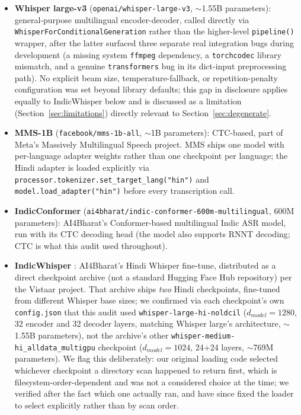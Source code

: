 \documentclass[11pt]{article}
\begin{document}
\begin{itemize}
\item \textbf{Whisper large-v3} \citep{radford2023whisper} (\texttt{openai/whisper-large-v3},
$\sim$1.55B parameters): general-purpose multilingual encoder-decoder, called directly via
\texttt{Whisper\allowbreak ForConditionalGeneration} rather than the higher-level \texttt{pipeline()} wrapper,
after the latter surfaced three separate real integration bugs during development (a missing
system \texttt{ffmpeg} dependency, a \texttt{torchcodec} library mismatch, and a genuine
\texttt{transformers} bug in its dict-input preprocessing path). No explicit beam size,
temperature-fallback, or repetition-penalty configuration was set beyond library defaults; this
gap in disclosure applies equally to IndicWhisper below and is discussed as a limitation
(Section~\ref{sec:limitations}) directly relevant to Section~\ref{sec:degenerate}.
\item \textbf{MMS-1B} \citep{pratap2023mms} (\texttt{facebook/mms-1b-all}, $\sim$1B parameters):
CTC-based, part of Meta's Massively Multilingual Speech project. MMS ships one model with
per-language adapter weights rather than one checkpoint per language; the Hindi adapter is loaded
explicitly via \texttt{processor.\allowbreak tokenizer.\allowbreak set\_target\_lang("hin")} and
\texttt{model.\allowbreak load\_adapter("hin")} before every transcription call.
\item \textbf{IndicConformer} \citep{indicconformer2025}
(\texttt{ai4bharat/\allowbreak indic-conformer-\allowbreak 600m-multilingual}, 600M parameters):
AI4Bharat's Conformer-based multilingual Indic ASR model, run with its CTC
decoding head (the model also supports RNNT decoding; CTC is what this audit used throughout).
\item \textbf{IndicWhisper} \citep{bhogale2023vistaar}: AI4Bharat's Hindi Whisper fine-tune,
distributed as a direct checkpoint archive (not a standard Hugging Face Hub repository) per the
Vistaar project. That archive ships \emph{two} Hindi checkpoints, fine-tuned from different
Whisper base sizes; we confirmed via each checkpoint's own \texttt{config.json} that this audit
used \texttt{whisper-large-hi-noldcil} ($d_{model}=1280$, 32 encoder and 32 decoder layers,
matching Whisper large's architecture, $\sim$1.55B parameters), not the archive's other
\texttt{whisper-medium-hi\_alldata\_multigpu} checkpoint ($d_{model}=1024$, 24+24 layers,
$\sim$769M parameters). We flag this deliberately: our original loading code selected whichever
checkpoint a directory scan happened to return first, which is filesystem-order-dependent and was
not a considered choice at the time; we verified after the fact which one actually ran, and have
since fixed the loader to select explicitly rather than by scan order.
\end{itemize}
\end{document}
